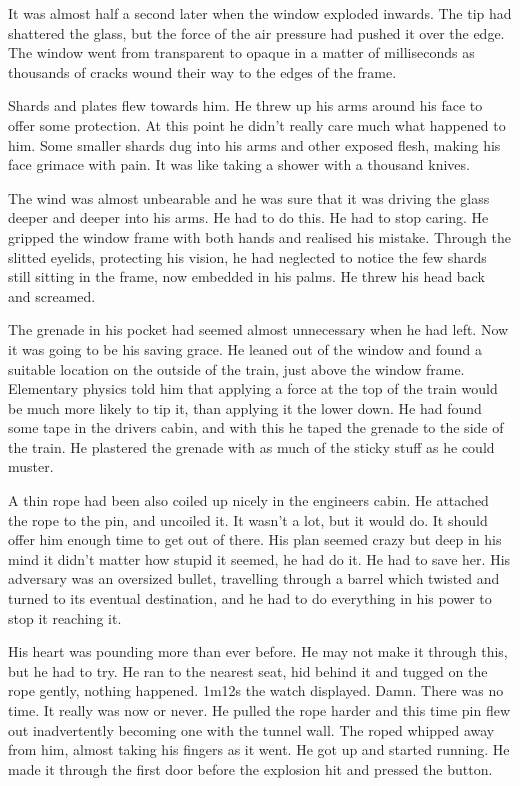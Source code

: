 It was almost half a second later when the window exploded inwards.  The tip had shattered the glass, but the force of the air pressure had pushed it over the edge.  The window went from transparent to opaque in a matter of milliseconds as thousands of cracks wound their way to the edges of the frame.

Shards and plates flew towards him.  He threw up his arms around his face to offer some protection.  At this point he didn't really care much what happened to him.  Some smaller shards dug into his arms and other exposed flesh, making his face grimace with pain.  It was like taking a shower with a thousand knives.

The wind was almost unbearable and he was sure that it was driving the glass deeper and deeper into his arms.  He had to do this.  He had to stop caring.  He gripped the window frame with both hands and realised his mistake.  Through the slitted eyelids, protecting his vision, he had neglected to notice the few shards still sitting in the frame, now embedded in his palms.  He threw his head back and screamed.

The grenade in his pocket had seemed almost unnecessary when he had left.  Now it was going to be his saving grace.  He leaned out of the window and found a suitable location on the outside of the train, just above the window frame.  Elementary physics told him that applying a force at the top of the train would be much more likely to tip it, than applying it the lower down.  He had found some tape in the drivers cabin, and with this he taped the grenade to the side of the train.  He plastered the grenade with as much of the sticky stuff as he could muster.  

A thin rope had been also coiled up nicely in the engineers cabin.  He attached the rope to the pin, and uncoiled it.  It wasn't a lot, but it would do.  It should offer him enough time to get out of there.  His plan seemed crazy but deep in his mind it didn't matter how stupid it seemed, he had do it.  He had to save her.  His adversary was an oversized bullet, travelling through a barrel which twisted and turned to its eventual destination, and he had to do everything in his power to stop it reaching it.

His heart was pounding more than ever before.  He may not make it through this, but he had to try.  He ran to the nearest seat, hid behind it and tugged on the rope gently, nothing happened.  1m12s the watch displayed.  Damn.  There was no time.  It really was now or never.  He pulled the rope harder and this time pin flew out inadvertently becoming one with the tunnel wall.  The roped whipped away from him, almost taking his fingers as it went.  He got up and started running.  He made it through the first door before the explosion hit and pressed the button.  

